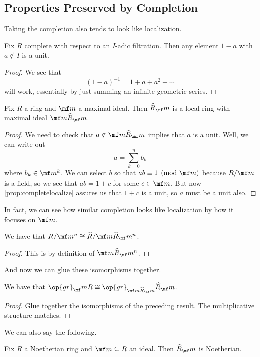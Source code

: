 \subsection{Properties Preserved by Completion}
Taking the completion also tends to look like localization.
\begin{proposition} \label{prop:completelocalize}
	Fix $R$ complete with respect to an $I$-adic filtration. Then any element $1-a$ with $a\notin I$ is a unit.
\end{proposition}
\begin{proof}
	We see that
	\[(1-a)^{-1}=1+a+a^2+\cdots\]
	will work, essentially by just summing an infinite geometric series.
\end{proof}
\begin{corollary}
	Fix $R$ a ring and $\mf m$ a maximal ideal. Then $\widehat R_\mf m$ is a local ring with maximal ideal $\mf m\widehat R_\mf m$.
\end{corollary}
\begin{proof}
	We need to check that $a\notin\mf m\widehat R_\mf m$ implies that $a$ is a unit. Well, we can write out
	\[a=\sum_{k=0}^nb_k\]
	where $b_k\in\mf m^k$. We can select $b$ so that $ab\equiv1\pmod{\mf m}$ because $R/\mf m$ is a field, so we see that $ab=1+c$ for some $c\in\mf m$. But now \autoref{prop:completelocalize} assures us that $1+c$ is a unit, so $a$ must be a unit also.
\end{proof}
In fact, we can see how similar completion looks like localization by how it focuses on $\mf m$.
\begin{lemma}
	We have that $R/\mf m^n\cong\widehat R/\mf m\widehat R_\mf m^n$.
\end{lemma}
\begin{proof}
	This is by definition of $\mf m\widehat R_\mf m^n$.
\end{proof}
And now we can glue these isomorphisms together.
\begin{corollary}
	We have that $\op{gr}_\mf mR\cong\op{gr}_{\mf m\widehat R_\mf m}\widehat R_\mf m$.
\end{corollary}
\begin{proof}
	Glue together the isomorphisms of the preceding result. The multiplicative structure matches.
\end{proof}
We can also say the following.
\begin{theorem}
	Fix $R$ a Noetherian ring and $\mf m\subseteq R$ an ideal. Then $\widehat R_\mf m$ is Noetherian.
\end{theorem}

